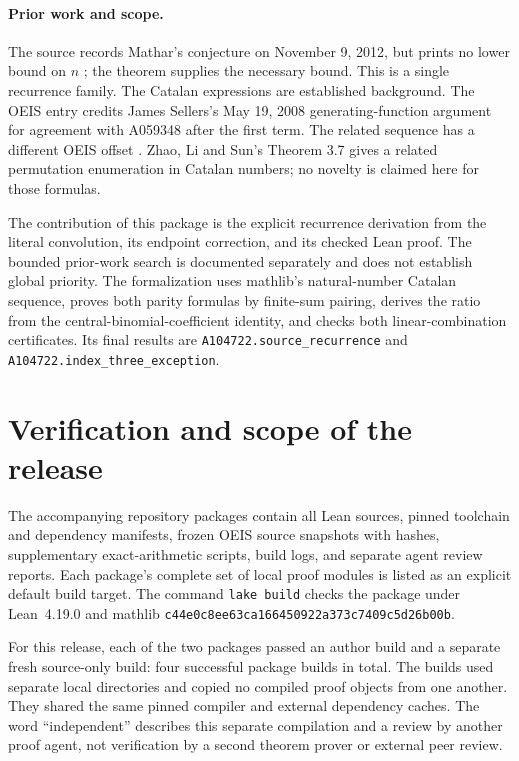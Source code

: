 \documentclass[11pt]{article}
\begin{document}
\paragraph{Prior work and scope.}
The source records Mathar's conjecture on November 9, 2012, but
prints no lower bound on $n$ \cite{a104722-source}; the theorem
supplies the necessary bound. This is a single recurrence family.
The Catalan expressions are established background. The OEIS
entry credits James Sellers's May 19, 2008 generating-function
argument for agreement with A059348 after the first term.
The related sequence has a different OEIS offset
\cite{a104722-related}. Zhao, Li and Sun's Theorem 3.7
\cite{a104722-zhao} gives a related permutation enumeration in
Catalan numbers; no novelty is claimed here for those formulas.

The contribution of this package is the explicit recurrence
derivation from the literal convolution, its endpoint correction,
and its checked Lean proof. The bounded prior-work search is
documented separately and does not establish global priority.
The formalization uses mathlib's natural-number Catalan sequence,
proves both parity formulas by finite-sum pairing, derives the ratio
from the central-binomial-coefficient identity, and checks both
linear-combination certificates. Its final results are
\texttt{A104722.source\_recurrence} and
\texttt{A104722.index\_three\_exception}.

\section{Verification and scope of the release}

The accompanying repository packages contain all Lean sources, pinned
toolchain and dependency manifests, frozen OEIS source snapshots with
hashes, supplementary exact-arithmetic scripts, build logs, and separate
agent review reports. Each package's complete set of local proof modules
is listed as an explicit default build target. The command
\texttt{lake build} checks the package under Lean~4.19.0 and mathlib
\texttt{c44e0c8ee63ca166450922a373c7409c5d26b00b}.

For this release, each of the two packages passed an author build and
a separate fresh source-only build: four successful package builds in
total. The builds used separate local directories and copied no compiled
proof objects from one another. They shared the same pinned compiler and
external dependency caches. The word ``independent'' describes this
separate compilation and a review by another proof agent, not verification
by a second theorem prover or external peer review.
\end{document}
